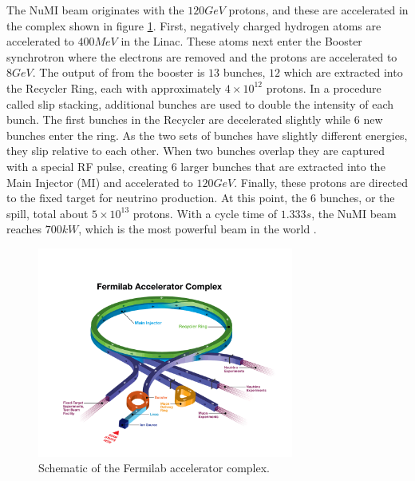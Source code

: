 The NuMI beam originates with the $120\unit{GeV}$ protons, and these are accelerated in the complex shown in figure \ref{fig:FNAL_AC}. First, negatively charged hydrogen atoms are accelerated to $400\unit{MeV}$ in the Linac. These atoms next enter the Booster synchrotron where the electrons are removed and the protons are accelerated to $8\unit{GeV}$. The output of from the booster is $13$ bunches, $12$ which are extracted into the Recycler Ring, each with approximately $4\times10^{12}$ protons. In a procedure called slip stacking, additional bunches are used to double the intensity of each bunch. The first bunches in the Recycler are decelerated slightly while $6$ new bunches enter the ring. As the two sets of bunches have slightly different energies, they slip relative to each other. When two bunches overlap they are captured with a special RF pulse, creating $6$ larger bunches that are extracted into the Main Injector (MI) and accelerated to $120\unit{GeV}$. Finally, these protons are directed to the fixed target for neutrino production. At this point, the 6 bunches, or the spill, total about $5\times10^{13}$ protons. With a cycle time of $1.333\unit{s}$, the NuMI beam reaches $700\unit{kW}$, which is the most powerful beam in the world \cite{ref:TDRNOvA}.
\begin{figure}[htb]
  \centering
  \includegraphics[width=0.75\textwidth]{figures/FNAL_AC.png}
  \caption[Fermilab Accelerator Complex]{Schematic of the Fermilab accelerator complex.}
  \label{fig:FNAL_AC}
\end{figure}

